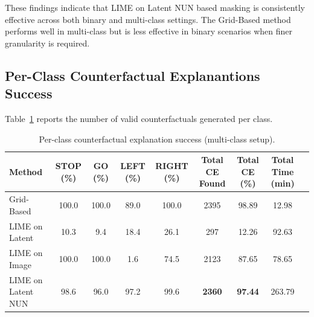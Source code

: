 \begin{table}[htbp]
\centering
{}
\caption{Comparison of counterfactual explanation validity across masking methods.}
\label{tab:ce_validity}
\end{table}

These findings indicate that LIME on Latent NUN based masking is consistently effective across both binary and multi-class settings. The Grid-Based method performs well in multi-class but is less effective in binary scenarios when finer granularity is required.


\subsection{Per-Class Counterfactual Explanantions Success}
Table~\ref{tab:classwise_ce_multi} reports the number of valid counterfactuals generated per class.

\begin{table}[htbp]
\centering
\scriptsize
\begin{tabular}{lcccccccc}
\toprule
\textbf{Method} & \textbf{STOP (\%)} & \textbf{GO (\%)} & \textbf{LEFT (\%)} & \textbf{RIGHT (\%)} & \textbf{Total CE Found} & \textbf{Total CE (\%)} & \textbf{Total Time (min)} \\
\midrule
Grid-Based        & 100.0 & 100.0 & 89.0  & 100.0 & 2395 & 98.89 & 12.98 \\
LIME on Latent    & 10.3  & 9.4   & 18.4  & 26.1  & 297  & 12.26 & 92.63 \\
LIME on Image     & 100.0 & 100.0 & 1.6   & 74.5  & 2123 & 87.65 & 78.65 \\
LIME on Latent NUN & 98.6  & 96.0  & 97.2  & 99.6  & \textbf{2360} & \textbf{97.44} & 263.79 \\
\bottomrule
\end{tabular}
\caption{Per-class counterfactual explanation success (multi-class setup).}
\label{tab:classwise_ce_multi}
\end{table}

